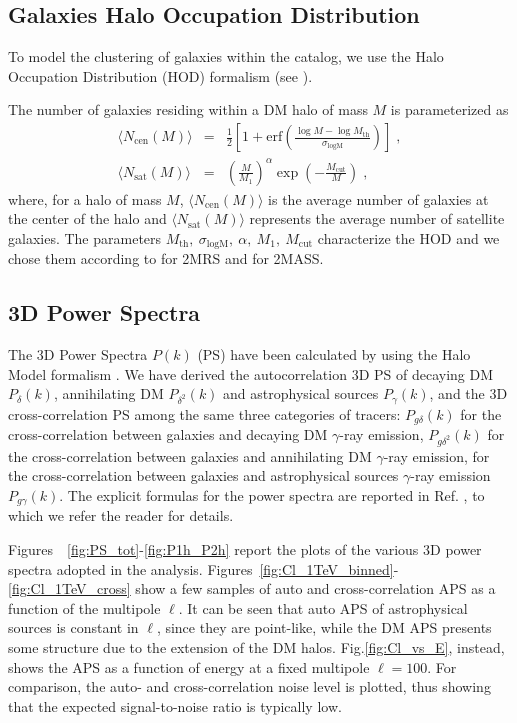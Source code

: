 \documentclass[aps,prd,a4paper,reprint,nofootinbib,superscriptaddress,floatfix,preprintnumbers]{revtex4-2}
\begin{document}
\subsection{Galaxies Halo Occupation Distribution}
To model the clustering of galaxies within the catalog, we use the Halo Occupation Distribution (HOD) formalism (see  \cite{Zheng:2004id,Berlind:2001xk,Cooray:2002dia}).


The number of galaxies residing within a DM halo of mass $M$ is parameterized as
\begin{eqnarray}
\langle N_\textrm{cen}(M)\rangle &=& \frac{1}{2}\left[1+\textrm{erf}\left(\frac{\log M-\log M_\textrm{th}}{\sigma_\textrm{logM}}\right)\right]\;, \label{eq:HOD1}\\
\langle N_\textrm{sat}(M)\rangle &=& \left( \frac{M}{M_1} \right)^\alpha \exp{\left(-\frac{M_\textrm{cut}}{M}\right)}\;,\label{eq:HOD2}
\end{eqnarray}
where, for a halo of mass $M$, $\langle N_\textrm{cen}(M) \rangle$ is the average number of galaxies at the center of the halo and $\langle N_\textrm{sat}(M)\rangle$ represents the average number of satellite galaxies.
The parameters $M_\textrm{th}, \ \sigma_\textrm{logM}, \ \alpha, \ M_1, \ M_\textrm{cut}$ characterize the HOD and we chose them according to 
\cite{Ando:2017wff} for 2MRS and \cite{Cuoco:2015rfa} for 2MASS.



\subsection{3D Power Spectra}
The 3D Power Spectra $P(k)$  (PS) have been calculated by using the Halo Model formalism \cite{Cooray:2002dia}. We have derived the autocorrelation 3D PS of decaying DM $P_\delta(k)$, annihilating DM $P_{\delta^2}(k)$ and astrophysical sources $P_\gamma(k)$, and the 3D cross-correlation PS among the same three categories of tracers: $P_{g\delta}(k)$ for the cross-correlation between galaxies and decaying DM $\gamma$-ray emission,  $P_{g\delta^2}(k)$ for the cross-correlation between galaxies and annihilating DM $\gamma$-ray emission, for the cross-correlation between galaxies and astrophysical sources $\gamma$-ray emission $P_{g\gamma}(k)$. The explicit formulas for the power spectra are reported in Ref. \cite{Cuoco:2015rfa}, to which we refer the reader for details. 

Figures~\ \ref{fig:PS_tot}-\ref{fig:P1h_P2h} report the plots of the various 3D power spectra adopted in the analysis. Figures~\ref{fig:Cl_1TeV_binned}-\ref{fig:Cl_1TeV_cross} show a few samples of auto and cross-correlation APS as a function of the multipole $\ell$. It can be seen that auto APS of astrophysical sources is constant in $\ell$, since they are point-like, while the DM APS presents some structure due to the extension of the DM halos. Fig.\ref{fig:Cl_vs_E}, instead, shows the APS as a function of energy at a fixed multipole $\ell=100$. For comparison, the auto- and cross-correlation noise level is plotted, thus showing that the expected signal-to-noise ratio is typically low.
\end{document}
